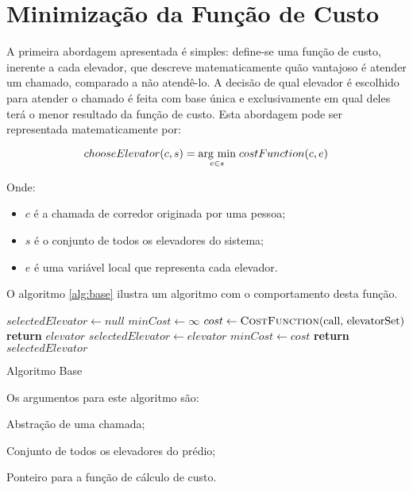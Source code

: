 \section{\label{sec:ai:minimize-cost-function}Minimização da Função de Custo}

A primeira abordagem apresentada é simples: define-se uma função de custo,
inerente a cada elevador, que descreve matematicamente quão vantajoso é atender
um chamado, comparado a não atendê-lo. A decisão de qual elevador é escolhido
para atender o chamado é feita com base única e exclusivamente em qual deles
terá o menor resultado da função de custo. Esta abordagem pode ser representada
matematicamente por:

\[chooseElevator(c, s) = \underset{e \in s}{\operatorname{arg}\,\operatorname{min}}\; costFunction(c, e)\]

Onde:
\begin{itemize}
\item \textbf{$c$} é a chamada de corredor originada por uma pessoa;
\item \textbf{$s$} é o conjunto de todos os elevadores do sistema;
\item \textbf{$e$} é uma variável local que representa cada elevador.
\end{itemize}

O algoritmo \ref{alg:base} ilustra um algoritmo com o comportamento desta
função.

\begin{algorithm}[htb]
\begin{center}
\begin{algorithmic}[1]
  \State $selectedElevator \leftarrow null$
  \State $minCost \leftarrow \infty$
    \State $cost \leftarrow \Call{CostFunction}{$call, elevatorSet$}$
      \State \textbf{return} $elevator$
    \EndIf
      \State $selectedElevator \leftarrow elevator$
      \State $minCost \leftarrow cost$
    \EndIf
  \EndFor
  \State \textbf{return} $selectedElevator$
\EndFunction
\end{algorithmic}
\end{center}
\caption
   {\label{alg:base}Algoritmo Base}
\end{algorithm}

Os argumentos para este algoritmo são:

\begin{description}[leftmargin=!,labelwidth=\widthof{\bfseries $costFunction$}]
  \item[$call$] Abstração de uma chamada;
  \item[$elevatorset$] Conjunto de todos os elevadores do prédio;
  \item[$costFunction$] Ponteiro para a função de cálculo de custo.
\end{description}

